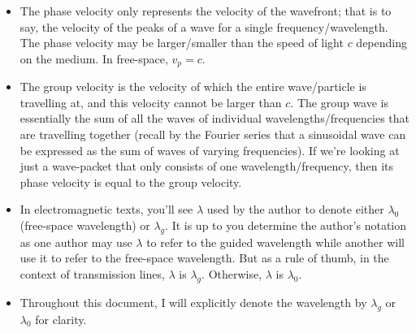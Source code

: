\begin{note} \phantom \newline 
\begin{itemize}
    \item The phase velocity only represents the velocity of the wavefront; that is to say, the velocity of the peaks of a wave for a single frequency/wavelength. The phase velocity may be larger/smaller than the speed of light $c$ depending on the medium. In free-space, $v_p = c$. 
    
    \item The group velocity is the velocity of which the entire wave/particle is travelling at, and this velocity cannot be larger than $c$. The group wave is essentially the sum of all the waves of individual wavelengths/frequencies that are travelling together (recall by the Fourier series that a sinusoidal wave can be expressed as the sum of waves of varying frequencies). If we're looking at just a wave-packet that only consists of one wavelength/frequency, then its phase velocity is equal to the group velocity. 

    \item In electromagnetic texts, you'll see $\lambda$ used by the author to denote either $\lambda_0$ (free-space wavelength) or $\lambda_g$. It is up to you determine the author's notation as one author may use $\lambda$ to refer to the guided wavelength while another will use it to refer to the free-space wavelength. But as a rule of thumb, in the context of transmission lines, $\lambda$ is $\lambda_g$. Otherwise, $\lambda$ is $\lambda_0$. 

    \item Throughout this document, I will explicitly denote the wavelength by $\lambda_g$ or $\lambda_0$ for clarity.
\end{itemize}
\end{note}

